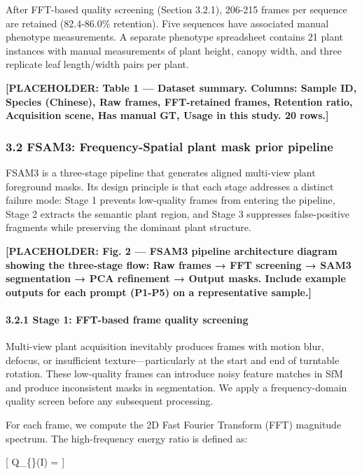 \documentclass[11pt,a4paper]{article}
\begin{document}
After FFT-based quality screening (Section 3.2.1), 206-215 frames per
sequence are retained (82.4-86.0\% retention). Five sequences have
associated manual phenotype measurements. A separate phenotype
spreadsheet contains 21 plant instances with manual measurements of
plant height, canopy width, and three replicate leaf length/width pairs
per plant.

\textbf{{[}PLACEHOLDER: Table 1 --- Dataset summary. Columns: Sample ID,
Species (Chinese), Raw frames, FFT-retained frames, Retention ratio,
Acquisition scene, Has manual GT, Usage in this study. 20 rows.{]}}

\subsubsection{3.2 FSAM3: Frequency-Spatial plant mask prior
pipeline}\label{fsam3-frequency-spatial-plant-mask-prior-pipeline}

FSAM3 is a three-stage pipeline that generates aligned multi-view plant
foreground masks. Its design principle is that each stage addresses a
distinct failure mode: Stage 1 prevents low-quality frames from entering
the pipeline, Stage 2 extracts the semantic plant region, and Stage 3
suppresses false-positive fragments while preserving the dominant plant
structure.

\textbf{{[}PLACEHOLDER: Fig. 2 --- FSAM3 pipeline architecture diagram
showing the three-stage flow: Raw frames → FFT screening → SAM3
segmentation → PCA refinement → Output masks. Include example outputs
for each prompt (P1-P5) on a representative sample.{]}}

\paragraph{3.2.1 Stage 1: FFT-based frame quality
screening}\label{stage-1-fft-based-frame-quality-screening}

Multi-view plant acquisition inevitably produces frames with motion
blur, defocus, or insufficient texture---particularly at the start and
end of turntable rotation. These low-quality frames can introduce noisy
feature matches in SfM and produce inconsistent masks in segmentation.
We apply a frequency-domain quality screen before any subsequent
processing.

For each frame, we compute the 2D Fast Fourier Transform (FFT) magnitude
spectrum. The high-frequency energy ratio is defined as:

{[} Q\_\{\}(I) =
 {]}
\end{document}
